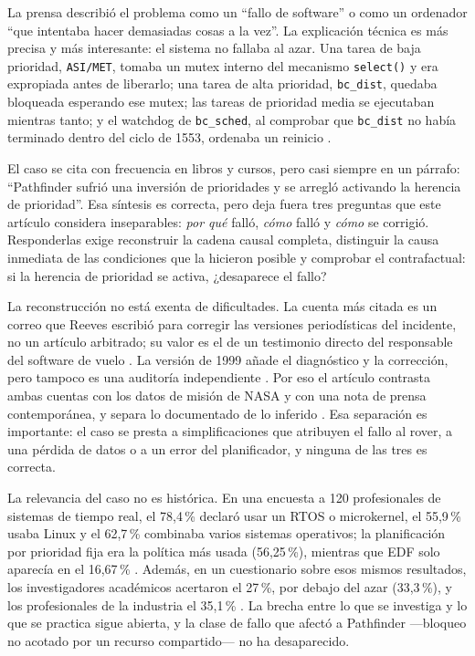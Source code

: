\documentclass[journal]{IEEEtran}
\begin{document}
La prensa describió el problema como un ``fallo de software'' o como un ordenador ``que intentaba hacer demasiadas cosas a la vez''. La explicación técnica es más precisa y más interesante: el sistema no fallaba al azar. Una tarea de baja prioridad, \texttt{ASI/MET}, tomaba un mutex interno del mecanismo \texttt{select()} y era expropiada antes de liberarlo; una tarea de alta prioridad, \texttt{bc\_dist}, quedaba bloqueada esperando ese mutex; las tareas de prioridad media se ejecutaban mientras tanto; y el watchdog de \texttt{bc\_sched}, al comprobar que \texttt{bc\_dist} no había terminado dentro del ciclo de 1553, ordenaba un reinicio \cite{reeves1997mars}.

El caso se cita con frecuencia en libros y cursos, pero casi siempre en un párrafo: ``Pathfinder sufrió una inversión de prioridades y se arregló activando la herencia de prioridad''. Esa síntesis es correcta, pero deja fuera tres preguntas que este artículo considera inseparables: \emph{por qué} falló, \emph{cómo} falló y \emph{cómo} se corrigió. Responderlas exige reconstruir la cadena causal completa, distinguir la causa inmediata de las condiciones que la hicieron posible y comprobar el contrafactual: si la herencia de prioridad se activa, ¿desaparece el fallo?

La reconstrucción no está exenta de dificultades. La cuenta más citada es un correo que Reeves escribió para corregir las versiones periodísticas del incidente, no un artículo arbitrado; su valor es el de un testimonio directo del responsable del software de vuelo \cite{reeves1997mars}. La versión de 1999 añade el diagnóstico y la corrección, pero tampoco es una auditoría independiente \cite{reeves1999priority}. Por eso el artículo contrasta ambas cuentas con los datos de misión de NASA y con una nota de prensa contemporánea, y separa lo documentado de lo inferido \cite{nasa2017pathfinder,ap1997glitch}. Esa separación es importante: el caso se presta a simplificaciones que atribuyen el fallo al rover, a una pérdida de datos o a un error del planificador, y ninguna de las tres es correcta.

La relevancia del caso no es histórica. En una encuesta a 120 profesionales de sistemas de tiempo real, el 78,4\,\% declaró usar un RTOS o microkernel, el 55,9\,\% usaba Linux y el 62,7\,\% combinaba varios sistemas operativos; la planificación por prioridad fija era la política más usada (56,25\,\%), mientras que EDF solo aparecía en el 16,67\,\% \cite{akesson2022survey}. Además, en un cuestionario sobre esos mismos resultados, los investigadores académicos acertaron el 27\,\%, por debajo del azar (33,3\,\%), y los profesionales de la industria el 35,1\,\% \cite{akesson2022survey}. La brecha entre lo que se investiga y lo que se practica sigue abierta, y la clase de fallo que afectó a Pathfinder ---bloqueo no acotado por un recurso compartido--- no ha desaparecido.
\end{document}
